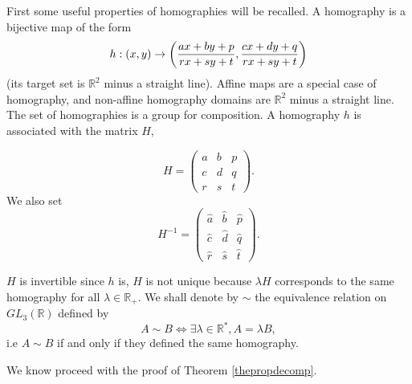 First some useful properties of homographies will be recalled. A homography is a bijective map of the form 
\[h:(x,y)\rightarrow \left(\frac{ax+by+p}{rx+sy+t},\frac{cx+dy+q}{rx+sy+t}\right)\]
(its target set is $\mathbb R^2$ minus a straight line). Affine maps are a special case of homography, and non-affine homography domains are $\mathbb R^2$ minus a straight line. The set of homographies is a group for composition. A homography $h$ is associated with the matrix $H$,

\begin{equation*}
	H=\begin{pmatrix}
	a&b&p\\c&d&q\\r&s&t
	\end{pmatrix}.
\end{equation*}
We also set
 \begin{equation*}
 H^{-1}=\begin{pmatrix} \hat a&\hat b&\hat p\\ \hat c&\hat d&\hat q\\ \hat r&\hat s&\hat t \end{pmatrix}.
 \end{equation*}

\noindent $H$ is invertible since $h$ is, $H$ is not unique because $\lambda H$ corresponds to the same homography for all $\lambda \in \mathbb{R}_+$. We shall denote by $\sim$ the equivalence relation on $GL_{3}(\mathbb{R})$ defined by \[A\sim B \iff \exists \lambda\in \mathbb{R}^{*} , A=\lambda B,\] i.e $A\sim B$ if and only if they defined the same homography. 

We know proceed with the proof of Theorem \ref{thepropdecomp}. 





